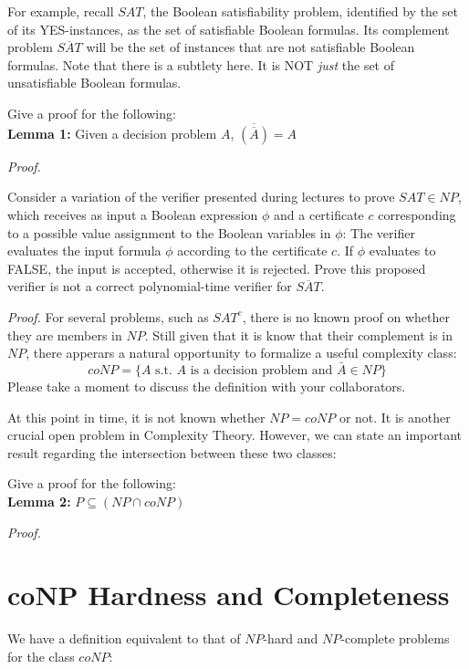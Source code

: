 \documentclass{cs0500}
\begin{document}
For example, recall $SAT$, the Boolean satisfiability problem, identified by the set of its YES-instances, as the set of satisfiable Boolean formulas. Its complement problem $\overline{SAT}$ will be the set of instances that are not satisfiable Boolean formulas. Note that there is a subtlety here. It is NOT \emph{just} the set of unsatisfiable Boolean formulas.

\begin{problem}
Give a proof for the following:\\

\noindent\textbf{Lemma 1:}   Given a decision problem $A$, $\overline{({\overline{A}})}=A$
\end{problem}
\noindent\emph{Proof.}
\newpage

\begin{problem}
Consider a variation of the verifier presented during lectures to prove $SAT\in NP$, which receives as input a Boolean expression $\phi$ and a certificate $c$ corresponding to a possible value assignment to the Boolean variables in $\phi$: The verifier evaluates the input formula $\phi$ according to the certificate $c$. If $\phi$ evaluates to FALSE, the input is accepted, otherwise it is rejected. Prove this proposed verifier is not a correct polynomial-time verifier for $\overline{SAT}$.
\end{problem}
\noindent\emph{Proof.}
\newpage
For several problems, such as $SAT^c$, there is no known proof on whether they are members in $NP$. Still given that it is know that their complement is in $NP$, there apperars a natural opportunity to formalize a useful complexity class:
$$
coNP=\{A\text{ s.t. }A\text{ is a decision problem and }\bar{A}\in NP\}
$$
Please take a moment to discuss the definition with your collaborators.

At this point in time, it is not known whether $NP=coNP$ or not. It is another crucial open problem in Complexity Theory. However, we can  state an important result regarding the intersection between these two classes:
\begin{problem}
Give a proof for the following:\\
\noindent\textbf{Lemma 2:}   $P\subseteq ( NP\cap coNP)$
\end{problem}
\noindent\emph{Proof.}
\newpage

\section{coNP Hardness and Completeness}
We have a definition equivalent to that of $NP$-hard and $NP$-complete problems for the class $coNP$:\\
\end{document}
